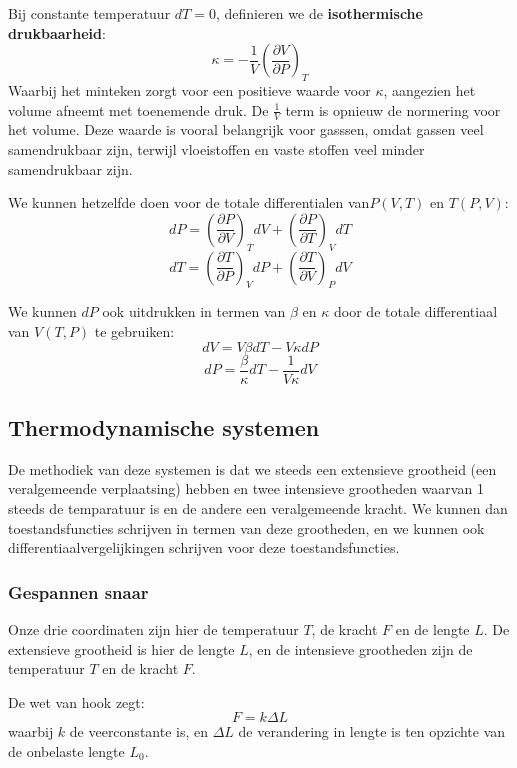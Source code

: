 Bij constante temperatuur \(dT = 0\), definieren we de \textbf{isothermische drukbaarheid}:
\begin{equation}
    \label{eq:isothermische-drukbaarheid}
    \kappa = -\frac{1}{V} \left( \frac{\partial V}{\partial P} \right)_T
\end{equation}
Waarbij het minteken zorgt voor een positieve waarde voor \(\kappa\), aangezien het volume afneemt met toenemende druk. De \(\frac{1}{V}\) term is opnieuw de normering voor het volume.
Deze waarde is vooral belangrijk voor gasssen, omdat gassen veel samendrukbaar zijn, terwijl vloeistoffen en vaste stoffen veel minder samendrukbaar zijn.

We kunnen hetzelfde doen voor de totale differentialen van\(P(V,T)\) en \(T(P,V)\):
\[dP = \left( \frac{\partial P}{\partial V} \right)_T dV + \left( \frac{\partial P}{\partial T} \right)_V dT\]
\[dT = \left( \frac{\partial T}{\partial P} \right)_V dP + \left( \frac{\partial T}{\partial V} \right)_P dV\]

We kunnen \(dP\) ook uitdrukken in termen van \(\beta\) en \(\kappa\) door de totale differentiaal van \(V(T,P)\) te gebruiken:
\[dV = V \beta dT - V \kappa dP\]
\[dP = \frac{\beta}{\kappa} dT - \frac{1}{V \kappa} dV\]

\subsection{Thermodynamische systemen}
De methodiek van deze systemen is dat we steeds een extensieve grootheid (een veralgemeende verplaatsing) hebben en twee intensieve grootheden waarvan 1 steeds de temparatuur is en de andere een veralgemeende kracht.
We kunnen dan toestandsfuncties schrijven in termen van deze grootheden, en we kunnen ook differentiaalvergelijkingen schrijven voor deze toestandsfuncties.
\subsubsection{Gespannen snaar}
Onze drie coordinaten zijn hier de temperatuur \(T\), de kracht \(F\) en de lengte \(L\). De extensieve grootheid is hier de lengte \(L\), en de intensieve grootheden zijn de temperatuur \(T\) en de kracht \(F\).

De wet van hook zegt:
\[F = k \Delta L\]
waarbij \(k\) de veerconstante is, en \(\Delta L\) de verandering in lengte is ten opzichte van de onbelaste lengte \(L_0\).

